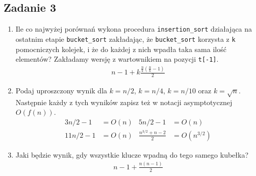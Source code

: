 \documentclass{article}
\begin{document}
\subsection*{Zadanie 3}
\begin{enumerate}[label=(\alph*)]
    \item Ile co najwyżej porównań wykona procedura \verb|insertion_sort| działająca na ostatnim
          etapie \verb|bucket_sort| zakładając, że \verb|bucket_sort| korzysta z \verb|k| pomocniczych kolejek,
          i że do każdej z nich wpadła taka sama ilość elementów? Zakładamy wersję z wartownikiem
          na pozycji \verb|t[-1]|.
          \begin{gather*}
              n-1 + k \frac{\frac{n}{k}(\frac{n}{k}-1)}{2}
          \end{gather*}
    \item Podaj uproszczony wynik dla $k = n/2$, $k = n/4$, $k = n/10$ oraz $k = \sqrt{n}$.
          Następnie każdy z tych wyników zapisz też w notacji asymptotycznej $O(f(n))$.
          \begin{align*}
              3n/2 - 1  & = O(n) & 5n/2 - 1              & = O(n)       \\
              11n/2 - 1 & = O(n) & \frac{n^{3/2}+n-2}{2} & = O(n^{3/2})
          \end{align*}
    \item Jaki będzie wynik, gdy wszystkie klucze wpadną do tego samego kubełka?
          \begin{gather*}
              n-1 + \frac{n(n-1)}{2}
          \end{gather*}
\end{enumerate}
\end{document}
